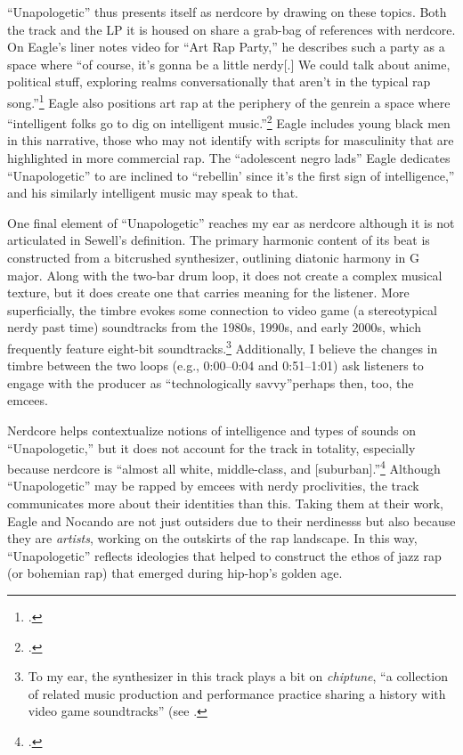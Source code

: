 ``Unapologetic'' thus presents itself as nerdcore by drawing on these topics. Both the track and the
LP it is housed on share a grab-bag of references with nerdcore. On Eagle's liner notes video for ``Art
Rap Party,'' he describes such a party as a space where ``of course, it's gonna be a little nerdy[.]
\textellipsis We could talk about anime, \textellipsis political stuff, exploring realms conversationally
that aren't in the typical rap song.''\footnote{
    \cite{openmikeeagleVideoLinerNotes2010}.}
Eagle also positions art rap at the periphery of the genre\textemdash in a space where ``intelligent
folks go to dig on intelligent music.''\footnote{
    \cite{openmikeeagleVideoLinerNotes2010}.} 
Eagle includes young black men in this narrative, those who may not identify with scripts for masculinity
that are highlighted in more commercial rap. The ``adolescent negro lads'' Eagle dedicates ``Unapologetic''
to  are inclined  to ``rebellin' since it's the first sign of intelligence,'' and his similarly intelligent
music may speak to that.

One final element of ``Unapologetic'' reaches my ear as nerdcore although it is not articulated in Sewell's
definition. The primary harmonic content of its beat is constructed from a bitcrushed synthesizer, outlining
diatonic harmony in G major. Along with the two-bar drum loop, it does not create a complex musical texture,
but it does create one that carries meaning for the listener. More superficially, the timbre evokes some 
connection to video game (a stereotypical nerdy past time) soundtracks from the 1980s, 1990s, and early 
2000s, which frequently feature eight-bit soundtracks.\footnote{
    To my ear, the synthesizer in this track plays a bit on \emph{chiptune}, ``a collection of related
    music production and performance practice sharing a history with video game soundtracks'' (see
    \cite{kevindriscollEndlessLoopBrief2009}.}
Additionally, I believe the changes in timbre between  the two loops (e.g., 0:00--0:04 and 0:51--1:01) ask
listeners to engage with the producer as ``technologically savvy''\textemdash perhaps then, too, the emcees.

Nerdcore helps contextualize notions of intelligence and types of sounds on ``Unapologetic,'' but it does
not account for the track in totality, especially because nerdcore is ``almost all white, middle-class, 
and [suburban].''\footnote{
    \autocite[223]{amandasewellNerdcoreHiphop2015}.} 
Although ``Unapologetic'' may be rapped by emcees with nerdy proclivities, the track communicates more
about their identities than this. Taking them at their work, Eagle and Nocando are not just outsiders 
due to their nerdinesss but also because they are \emph{artists}, working on the outskirts of the rap
landscape.  In this way, ``Unapologetic'' reflects ideologies that helped to construct the ethos of 
jazz rap (or bohemian rap) that emerged during hip-hop's golden age.

